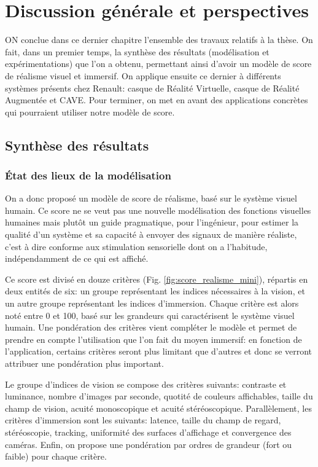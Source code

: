 \chapter*{Discussion générale et perspectives}

\lettrine[lines=3]{O}{N} conclue dans ce dernier chapitre l'ensemble des travaux relatifs à la thèse. On fait, dans un premier temps, la synthèse des résultats (modélisation et expérimentations) que l'on a obtenu, permettant ainsi d'avoir un modèle de score de réalisme visuel et immersif. On applique ensuite ce dernier à différents systèmes présents chez Renault: casque de Réalité Virtuelle, casque de Réalité Augmentée et CAVE. Pour terminer, on met en avant des applications concrètes qui pourraient utiliser notre modèle de score.

\section*{Synthèse des résultats}
	\subsection*{État des lieux de la modélisation}
	\par On a donc proposé un modèle de score de réalisme, basé sur le système visuel humain. Ce score ne se veut pas une nouvelle modélisation des fonctions visuelles humaines mais plutôt un guide pragmatique, pour l'ingénieur, pour estimer la qualité d'un système et sa capacité à envoyer des signaux de manière réaliste, c'est à dire conforme aux stimulation sensorielle dont on a l'habitude, indépendamment de ce qui est affiché.
	
	\par Ce score est divisé en douze critères (Fig. \ref{fig:score_realisme_mini}), répartis en deux entités de six: un groupe représentant les indices nécessaires à la vision, et un autre groupe représentant les indices d'immersion. Chaque critère est alors noté entre 0 et 100, basé sur les grandeurs qui caractérisent le système visuel humain. Une pondération des critères vient compléter le modèle et permet de prendre en compte l'utilisation que l'on fait du moyen immersif: en fonction de l'application, certains critères seront plus limitant que d'autres et donc se verront attribuer une pondération plus important.
	
	\par Le groupe d'indices de vision se compose des critères suivants: contraste et luminance, nombre d'images par seconde, quotité de couleurs affichables, taille du champ de vision, acuité monoscopique et acuité stéréoscopique. Parallèlement, les critères d'immersion sont les suivants: latence, taille du champ de regard, stéréoscopie, tracking, uniformité des surfaces d'affichage et convergence des caméras. Enfin, on propose une pondération par ordres de grandeur (fort ou faible) pour chaque critère.
	
